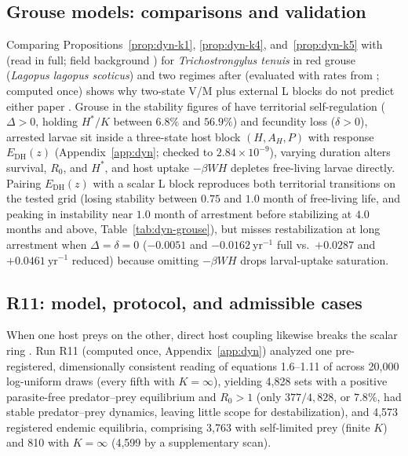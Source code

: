 \subsection{Grouse models: comparisons and validation}\label{esm:trim-grouse}
Comparing Propositions~\ref{prop:dyn-k1}, \ref{prop:dyn-k4}, and~\ref{prop:dyn-k5} with \citet{dobson1992} (read in full; field background \citealp{hudson1992}) for \emph{Trichostrongylus tenuis} in red grouse (\emph{Lagopus lagopus scoticus}) and two regimes after \citet{gaba2008} (evaluated with rates from \citealp{dobson1992}; computed once) shows why two-state V/M plus external L blocks do not predict either paper \citep[compare][]{may1978,rosa2002}. Grouse in the stability figures of \citet{dobson1992} have territorial self-regulation ($\Delta > 0$, holding $H^*/K$ between $6.8\%$ and $56.9\%$) and fecundity loss ($\delta > 0$), arrested larvae sit inside a three-state host block $(H, A_H, P)$ with response $E_{\mathrm{DH}}(z)$ (Appendix~\ref{app:dyn}; checked to $2.84 \times 10^{-9}$), varying duration alters survival, $R_0$, and $H^*$, and host uptake $-\beta WH$ depletes free-living larvae directly. Pairing $E_{\mathrm{DH}}(z)$ with a scalar L block reproduces both territorial transitions on the tested grid (losing stability between $0.75$ and $1.0$ month of free-living life, and peaking in instability near $1.0$ month of arrestment before stabilizing at $4.0$ months and above, Table~\ref{tab:dyn-grouse}), but misses restabilization at long arrestment when $\Delta = \delta = 0$ ($-0.0051$ and $-0.0162\ \mathrm{yr}^{-1}$ full vs.\ $+0.0287$ and $+0.0461\ \mathrm{yr}^{-1}$ reduced) because omitting $-\beta WH$ drops larval-uptake saturation.

\subsection{R11: model, protocol, and admissible cases}\label{esm:trim-r11-protocol}
When one host preys on the other, direct host coupling likewise breaks the scalar ring \citep{dobson1988,hadeler1989,fenton2006,rogawa2018}. Run R11 (computed once, Appendix~\ref{app:dyn}) analyzed one pre-registered, dimensionally consistent reading of equations 1.6--1.11 of \citet{dobson2020} across 20,000 log-uniform draws (every fifth with $K = \infty$), yielding 4,828 sets with a positive parasite-free predator--prey equilibrium and $R_0 > 1$ (only $377/4{,}828$, or $7.8\%$, had stable predator--prey dynamics, leaving little scope for destabilization), and 4,573 registered endemic equilibria, comprising 3,763 with self-limited prey (finite $K$) and 810 with $K = \infty$ (4,599 by a supplementary scan).

